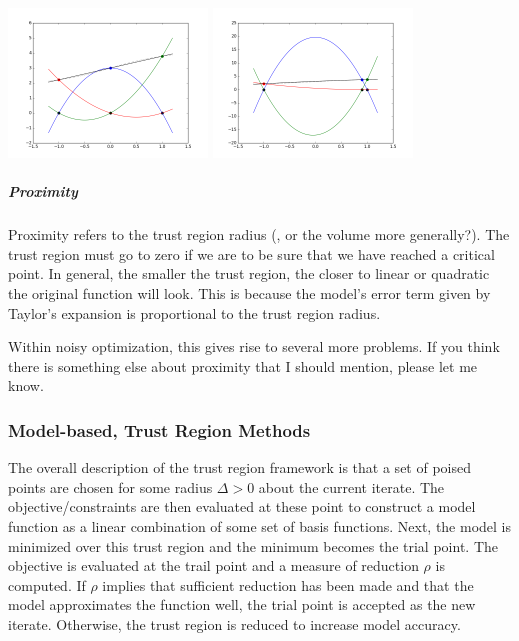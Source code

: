 \documentclass{article}
\begin{document}
\includegraphics[width=200px]{poised_approx.png}
\includegraphics[width=200px]{illpoised_approx.png}

\subparagraph{Proximity}
Proximity refers to the trust region radius 
\color{blue}(, or the volume more generally?).\color{black}
The trust region must go to zero if we are to be sure that we have reached a critical point.
In general, the smaller the trust region, the closer to linear or quadratic the original function will look.
This is because the model's error term given by Taylor's expansion is proportional to the trust region radius.

\color{red} Within noisy optimization, this gives rise to several more problems. If you think there is something else about proximity that I should mention, please let me know. \color{black}

\subsubsection{Model-based, Trust Region Methods}

The overall description of the trust region framework is that a set of poised points are chosen for some radius $\Delta>0$ about the current iterate.
The objective/constraints are then evaluated at these point to construct a model function as a linear combination of some set of basis functions.
Next, the model is minimized over this trust region and the minimum becomes the trial point.
The objective is evaluated at the trail point and a measure of reduction $\rho$ is computed.
If $\rho$ implies that sufficient reduction has been made and that the model approximates the function well, the trial point is accepted as the new iterate.
Otherwise, the trust region is reduced to increase model accuracy.
\end{document}
